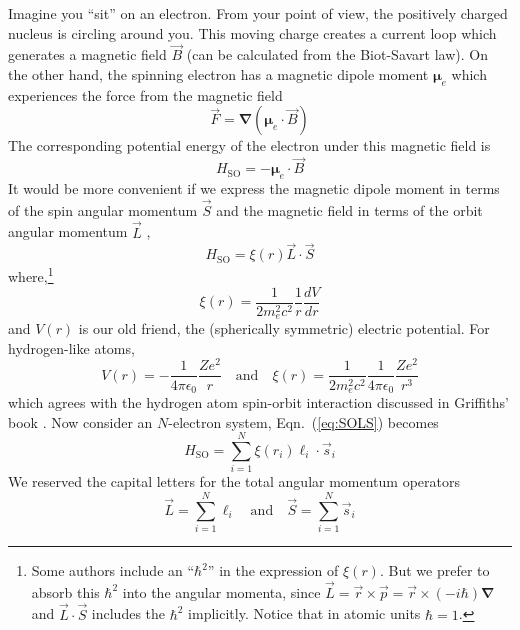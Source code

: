 Imagine you ``sit'' on an electron. From your point of view, the positively charged
nucleus is circling around you. This moving charge creates a current loop which
generates a magnetic field $\vec{B}$ (can be calculated from the Biot-Savart law).
On the other hand, the spinning electron has a magnetic dipole moment $\boldsymbol{\mu}_e$
which experiences the force from the magnetic field
\begin{equation} \label{eq:Bmu}
\vec{F} = \boldsymbol{\nabla}(\boldsymbol{\mu}_e\cdot\vec{B})
\end{equation}
The corresponding potential energy of the electron under this magnetic field is
\begin{equation} \label{eq:SOBmu}
H_\text{SO} = -\boldsymbol{\mu}_e\cdot\vec{B}
\end{equation}
%
It would be more convenient if we express the magnetic dipole moment in terms
of the spin angular momentum $\vec{S}$ and the magnetic field in terms of the
orbit angular momentum $\vec{L}$ \cite{WB},
\begin{equation} \label{eq:SOLS}
H_\text{SO} = \xi(r) \vec{L}\cdot\vec{S}
\end{equation}
where,\footnote{Some authors include an ``$\hbar^2$'' in the expression of $\xi(r)$.
But we prefer to absorb this $\hbar^2$ into the angular momenta, since $\vec{L}=
\vec{r}\times\vec{p}=\vec{r}\times (-i\hbar)\boldsymbol{\nabla}$ and $\vec{L}\cdot\vec{S}$
includes the $\hbar^2$ implicitly. Notice that in atomic units $\hbar=1$.}
\begin{equation} \label{eq:xir}
\xi(r) = \frac{1}{2m_e^2c^2} \frac{1}{r} \frac{dV}{dr}
\end{equation}
and $V(r)$ is our old friend, the (spherically symmetric) electric potential.
For hydrogen-like atoms,
\begin{equation}
V(r) = -\frac{1}{4\pi\epsilon_0}\frac{Ze^2}{r}
\quad \text{and} \quad
\xi(r) = \frac{1}{2m_e^2c^2} \frac{1}{4\pi\epsilon_0}\frac{Ze^2}{r^3}
\end{equation}
which agrees with the hydrogen atom spin-orbit interaction
discussed in Griffiths' book \cite{QM}. Now consider
an $N$-electron system, Eqn.~(\ref{eq:SOLS}) becomes
\begin{equation} \label{eq:HSO}
\boxed{
H_\text{SO} = \sum_{i=1}^N \xi(r_i) \boldsymbol{\ell}_i\cdot\vec{s}_i
}
\end{equation}
We reserved the capital letters for the total angular momentum operators
\begin{equation}
\vec{L} = \sum_{i=1}^N \boldsymbol{\ell}_i
\quad \text{and} \quad
\vec{S} = \sum_{i=1}^N \vec{s}_i
\end{equation}
